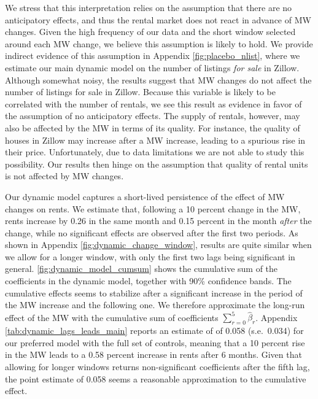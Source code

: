 We stress that this interpretation relies on the assumption that there are no anticipatory
effects, and thus the rental market does not react in advance of MW changes. Given the high 
frequency of our data and the short window selected around each MW change, we believe this 
assumption is likely to hold. We provide indirect evidence of this assumption in Appendix 
\autoref{fig:placebo_nlist}, where we estimate our main dynamic model on the number of listings 
\textit{for sale} in Zillow. Although somewhat noisy, the results suggest that MW changes do 
not affect the number of listings for sale in Zillow. Because this variable is likely to be 
correlated with the number of rentals, we see this result as evidence in favor of the 
assumption of no anticipatory effects. The supply of rentals, however, may also be affected 
by the MW in terms of its quality. For instance, the quality of houses in Zillow may increase 
after a MW increase, leading to a spurious rise in their price. Unfortunately, due to data 
limitations we are not able to study this possibility. Our results then hinge on the assumption 
that quality of rental units is not affected by MW changes.

Our dynamic model captures a short-lived persistence of the effect of MW changes on rents. We 
estimate that, following a 10 percent change in the MW, rents increase by 0.26 in the same month 
and 0.15 percent in the month \textit{after} the change, while no significant effects are 
observed after the first two periods. As shown in Appendix \autoref{fig:dynamic_change_window}, 
results are quite similar when we allow for a longer window, with only the first two lags being 
significant in general.
\autoref{fig:dynamic_model_cumsum} shows the cumulative sum of the coefficients in the dynamic 
model, together with 90\% confidence bands. The cumulative effects seems to stabilize after a 
significant increase in the period of the MW increase and the following one. We therefore 
approximate the long-run effect of the MW with the cumulative sum of coefficients 
$\sum_{r=0}^{5} \hat{\beta}_{r}$. Appendix \autoref{tab:dynamic_lags_leads_main} reports an 
estimate of of 0.058 (s.e.\ 0.034) for our preferred model with the full set of controls, 
meaning that a 10 percent rise in the MW leads to a 0.58 percent increase in rents after 6 
months. Given that allowing for longer windows returns non-significant coefficients after the 
fifth lag, the point estimate of 0.058 seems a reasonable approximation to the cumulative effect.

